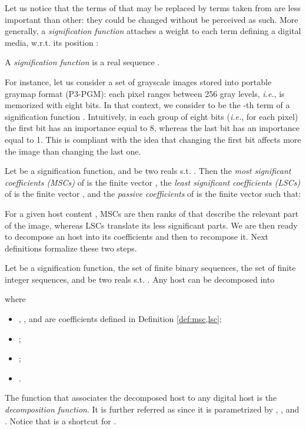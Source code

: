 \documentclass{comjnl}
\begin{document}
Let us notice that the terms of  that may be replaced by terms taken
from  are less important than other: they could be changed 
without be perceived as such. More generally, a 
\emph{signification function} 
attaches a weight to each term defining a digital media,
w.r.t. its position :

\begin{definition}
A \emph{signification function} is a real sequence 
. \end{definition}













For instance, let us consider a set of    
grayscale images stored into portable graymap format (P3-PGM):
each pixel ranges between 256 gray levels, \textit{i.e.},
is memorized with eight bits.
In that context, we consider 
  to be the -th term of a signification function 
. 
Intuitively, in each group of eight bits (\textit{i.e.}, for each pixel) 
the first bit has an importance equal to 8, whereas the last bit has an
importance equal to 1. This is compliant with the idea that
changing the first bit affects more the image than changing the last one.





\begin{definition}\label{def:msc,lsc}
Let  be a signification function, 
 and  be two reals s.t. . Then 
the \emph{most significant coefficients (MSCs)} of  is the finite 
  vector , 
the \emph{least significant coefficients (LSCs)} of  is the 
finite vector , and 
the \emph{passive coefficients} of  is the finite vector  such that:

 \end{definition}

For a given host content ,
MSCs are then ranks of   that describe the relevant part
of the image, whereas LSCs translate its less significant parts.
We are then ready to decompose an host  into its coefficients and 
then to recompose it. Next definitions formalize these two steps. 

\begin{definition}
Let  be a signification function, 
 the set of finite binary sequences,
 the set of finite integer sequences, 
 and  be two reals s.t. .  
Any host  can be decomposed into 

where
\begin{itemize}
\item , , and  are coefficients defined in Definition  
\ref{def:msc,lsc};
\item ;
 \item ;
 \item .
 \end{itemize}
The function that associates the decomposed host to any digital host is 
the \emph{decomposition function}. It is 
further referred as  since it is parametrized by 
, , and . Notice that  is a shortcut for .
\end{definition} 
\end{document}
